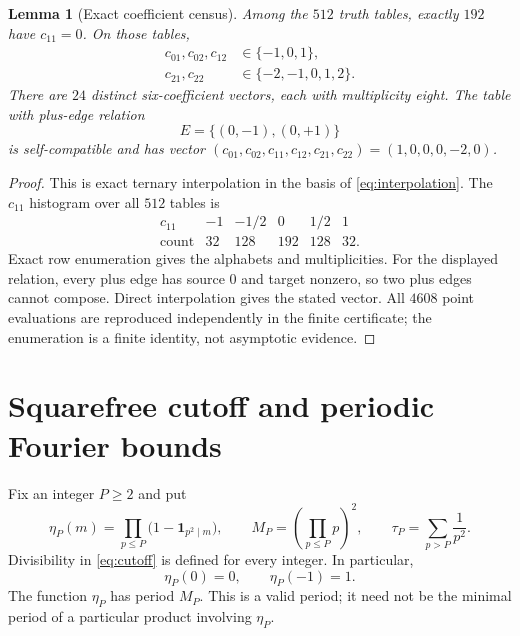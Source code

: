 \documentclass[11pt]{article}
\newtheorem{lemma}[theorem]{Lemma}
\theoremstyle{definition}
\theoremstyle{remark}
\begin{document}
\begin{lemma}[Exact coefficient census]
\label{lem:coefficient-census}
Among the $512$ truth tables, exactly $192$ have $c_{11}=0$.  On those
tables,
\begin{align*}
 c_{01},c_{02},c_{12}&\in\{-1,0,1\},\\
 c_{21},c_{22}&\in\{-2,-1,0,1,2\}.
\end{align*}
There are $24$ distinct six-coefficient vectors, each with multiplicity
eight.  The table with plus-edge relation
\[
                       E=\{(0,-1),(0,+1)\}
\]
is self-compatible and has vector
$(c_{01},c_{02},c_{11},c_{12},c_{21},c_{22})=(1,0,0,0,-2,0)$.
\end{lemma}

\begin{proof}
This is exact ternary interpolation in the basis of
\eqref{eq:interpolation}.  The $c_{11}$ histogram over all $512$ tables is
\[
\begin{array}{c|rrrrr}
c_{11}&-1&-1/2&0&1/2&1\\ \hline
\text{count}&32&128&192&128&32.
\end{array}
\]
Exact row enumeration gives the alphabets and multiplicities.  For the
displayed relation, every plus edge has source $0$ and target nonzero, so
two plus edges cannot compose.  Direct interpolation gives the stated
vector.  All $4608$ point evaluations are reproduced independently in the
finite certificate; the enumeration is a finite identity, not asymptotic
evidence.
\end{proof}

\section{Squarefree cutoff and periodic Fourier bounds}

Fix an integer $P\ge2$ and put
\begin{equation}
 \eta_P(m)=\prod_{p\le P}\bigl(1-\mathbf1_{p^2\mid m}\bigr),
 \qquad
 M_P=\left(\prod_{p\le P}p\right)^2,
 \qquad
 \tau_P=\sum_{p>P}\frac1{p^2}.
 \label{eq:cutoff}
\end{equation}
Divisibility in \eqref{eq:cutoff} is defined for every integer.  In
particular,
\begin{equation}
                         \eta_P(0)=0,\qquad \eta_P(-1)=1.
 \label{eq:eta-endpoints}
\end{equation}
The function $\eta_P$ has period $M_P$.  This is a valid period; it need
not be the minimal period of a particular product involving $\eta_P$.
\end{document}
